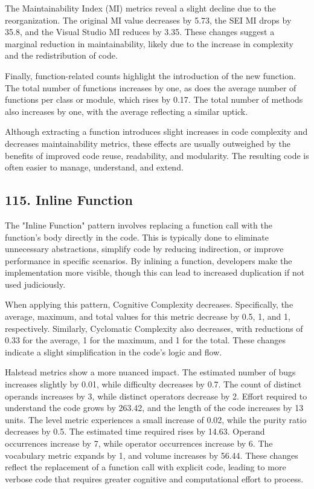 The Maintainability Index (MI) metrics reveal a slight decline due to the reorganization. The original MI value decreases by 5.73, the SEI MI drops by 35.8, and the Visual Studio MI reduces by 3.35. These changes suggest a marginal reduction in maintainability, likely due to the increase in complexity and the redistribution of code.

Finally, function-related counts highlight the introduction of the new function. The total number of functions increases by one, as does the average number of functions per class or module, which rises by 0.17. The total number of methods also increases by one, with the average reflecting a similar uptick.

Although extracting a function introduces slight increases in code complexity and decreases maintainability metrics, these effects are usually outweighed by the benefits of improved code reuse, readability, and modularity. The resulting code is often easier to manage, understand, and extend.

\subsection{115. Inline Function}

The "Inline Function" pattern involves replacing a function call with the function's body directly in the code. This is typically done to eliminate unnecessary abstractions, simplify code by reducing indirection, or improve performance in specific scenarios. By inlining a function, developers make the implementation more visible, though this can lead to increased duplication if not used judiciously.

When applying this pattern, Cognitive Complexity decreases. Specifically, the average, maximum, and total values for this metric decrease by 0.5, 1, and 1, respectively. Similarly, Cyclomatic Complexity also decreases, with reductions of 0.33 for the average, 1 for the maximum, and 1 for the total. These changes indicate a slight simplification in the code's logic and flow.

Halstead metrics show a more nuanced impact. The estimated number of bugs increases slightly by 0.01, while difficulty decreases by 0.7. The count of distinct operands increases by 3, while distinct operators decrease by 2. Effort required to understand the code grows by 263.42, and the length of the code increases by 13 units. The level metric experiences a small increase of 0.02, while the purity ratio decreases by 0.5. The estimated time required rises by 14.63. Operand occurrences increase by 7, while operator occurrences increase by 6. The vocabulary metric expands by 1, and volume increases by 56.44. These changes reflect the replacement of a function call with explicit code, leading to more verbose code that requires greater cognitive and computational effort to process.

